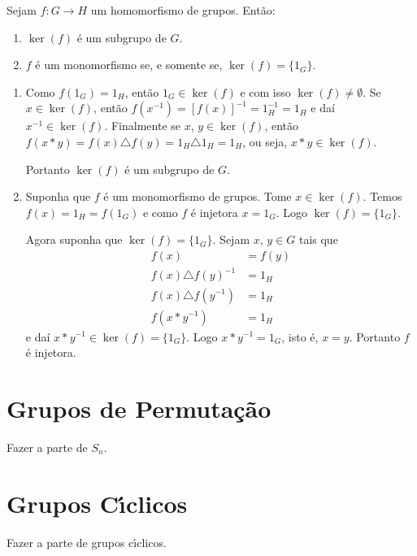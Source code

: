 \begin{proposicao}
	Sejam $f : G \to H$ um homomorfismo de grupos. Então:
	\begin{enumerate}
		\item $\ker(f)$ é um subgrupo de $G$.
		\item $f$ é um monomorfismo se, e somente se, $\ker(f) = \{1_G\}$.
	\end{enumerate}
\end{proposicao}
\begin{prova}
	\begin{enumerate}
		\item Como $f(1_G) = 1_H$, então $1_G \in \ker(f)$ e com isso $\ker(f) \ne \emptyset$. Se $x \in \ker(f)$, então $f(x^{-1}) = [f(x)]^{-1} = 1_H^{-1} = 1_H$ e daí $x^{-1} \in \ker(f)$. Finalmente se $x$, $y \in \ker(f)$, então $f(x*y) = f(x)\triangle f(y) = 1_H \triangle 1_H = 1_H$, ou seja, $x * y \in \ker(f)$.

		Portanto $\ker(f)$ é um subgrupo de $G$.

		\item Suponha que $f$ é um monomorfismo de grupos. Tome $x \in \ker(f)$. Temos $f(x) = 1_H = f(1_G)$ e como $f$ é injetora $x = 1_G$. Logo $\ker(f) = \{1_G\}$.

		Agora suponha que $\ker(f) = \{1_G\}$. Sejam $x$, $y \in G$ tais que
		\begin{align*}
			f(x) &= f(y)\\
			f(x)\triangle f(y)^{-1} & = 1_H\\
			f(x)\triangle f(y^{-1}) &= 1_H\\
			f(x * y^{-1}) &= 1_H
		\end{align*}
		e daí $x*y^{-1} \in \ker(f) = \{1_G\}$. Logo $x*y^{-1} = 1_G$, isto é, $x = y$. Portanto $f$ é injetora.
	\end{enumerate}
\end{prova}





\section{Grupos de Permuta\c{c}\~ao}
Fazer a parte de $S_n$.

\section{Grupos C{\'\i}clicos}
Fazer a parte de grupos c{\'\i}clicos.